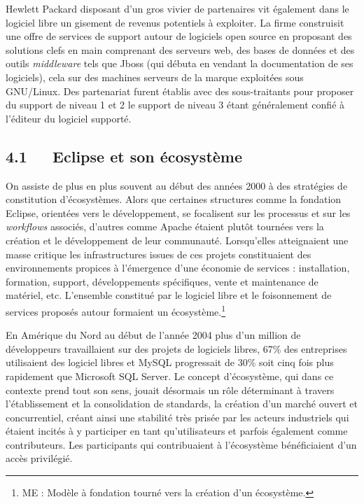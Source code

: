 \documentclass{FramateX}
\begin{document}
\begin{refsection}
Hewlett Packard disposant d'un gros vivier de partenaires vit également
dans le logiciel libre un gisement de revenus potentiels à exploiter.
La firme construisit une offre de services de support autour de
logiciels open source en proposant des solutions clefs en main
comprenant des serveurs web, des bases de données et des outils
\textit{middleware} tels que Jboss (qui débuta en vendant la
documentation de ses logiciels), cela sur des machines serveurs de la
marque exploitées sous GNU/Linux. Des partenariat furent établis avec
des sous-traitants pour proposer du support de niveau 1 et 2 le support
de niveau 3 étant généralement confié à l'éditeur du logiciel
supporté.

\subsection*{4.1~~~Eclipse et son écosystème}
{}

On assiste de plus en plus souvent au début des années 2000 à des
stratégies de constitution d'écosystèmes. Alors que certaines
structures comme la fondation Eclipse, orientées vers le développement,
se focalisent sur les processus et sur les \textit{workflows} associés,
d'autres comme Apache étaient plutôt tournées vers la création et le
développement de leur communauté. Lorsqu'elles atteignaient une masse
critique les infrastructures issues de ces projets constituaient des
environnements propices à l'émergence d'une économie de services :
installation, formation, support, développements spécifiques, vente et
maintenance de matériel, etc. L'ensemble constitué par le logiciel
libre et le foisonnement de services proposés autour formaient un
écosystème.\footnote{ME : Modèle à fondation tourné vers la création
d'un écosystème.}

En Amérique du Nord au début de l'année 2004 plus d'un million de
développeurs travaillaient sur des projets de logiciels libres, 67\%
des entreprises utilisaient des logiciel libres et MySQL progressait de
30\% soit cinq fois plus rapidement que Microsoft SQL Server. Le
concept d'écosystème, qui dans ce contexte prend tout son sens, jouait
désormais un rôle déterminant à travers l'établissement et la
consolidation de standards, la création d'un marché ouvert et
concurrentiel, créant ainsi une stabilité très prisée par les acteurs
industriels qui étaient incités à y participer en tant qu'utilisateurs
et parfois également comme contributeurs. Les participants qui
contribuaient à l'écosystème bénéficiaient d'un accès privilégié.


\end{refsection}
\end{document}
